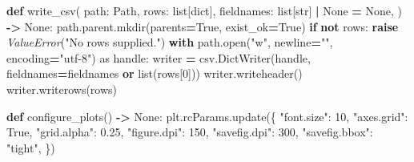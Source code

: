 \documentclass[
  12pt,a4paper,oneside]{report}
\newenvironment{Shaded}{\begin{snugshade}}{\end{snugshade}}
\newcommand{\BuiltInTok}[1]{#1}
\newcommand{\ControlFlowTok}[1]{\textcolor[rgb]{0.13,0.29,0.53}{\textbf{#1}}}
\newcommand{\DecValTok}[1]{\textcolor[rgb]{0.00,0.00,0.81}{#1}}
\newcommand{\FloatTok}[1]{\textcolor[rgb]{0.00,0.00,0.81}{#1}}
\newcommand{\ImportTok}[1]{#1}
\newcommand{\KeywordTok}[1]{\textcolor[rgb]{0.13,0.29,0.53}{\textbf{#1}}}
\newcommand{\NormalTok}[1]{#1}
\newcommand{\OperatorTok}[1]{\textcolor[rgb]{0.81,0.36,0.00}{\textbf{#1}}}
\newcommand{\PreprocessorTok}[1]{\textcolor[rgb]{0.56,0.35,0.01}{\textit{#1}}}
\newcommand{\StringTok}[1]{\textcolor[rgb]{0.31,0.60,0.02}{#1}}
\newcommand{\VariableTok}[1]{\textcolor[rgb]{0.00,0.00,0.00}{#1}}
\begin{document}
\begin{Shaded}
\begin{Highlighting}[]
\KeywordTok{def}\NormalTok{ write\_csv(}
\NormalTok{    path: Path, rows: }\BuiltInTok{list}\NormalTok{[}\BuiltInTok{dict}\NormalTok{], fieldnames: }\BuiltInTok{list}\NormalTok{[}\BuiltInTok{str}\NormalTok{] }\OperatorTok{|} \VariableTok{None} \OperatorTok{=} \VariableTok{None}\NormalTok{,}
\NormalTok{) }\OperatorTok{{-}\textgreater{}} \VariableTok{None}\NormalTok{:}
\NormalTok{    path.parent.mkdir(parents}\OperatorTok{=}\VariableTok{True}\NormalTok{, exist\_ok}\OperatorTok{=}\VariableTok{True}\NormalTok{)}
    \ControlFlowTok{if} \KeywordTok{not}\NormalTok{ rows:}
        \ControlFlowTok{raise} \PreprocessorTok{ValueError}\NormalTok{(}\StringTok{"No rows supplied."}\NormalTok{)}
    \ControlFlowTok{with}\NormalTok{ path.}\BuiltInTok{open}\NormalTok{(}\StringTok{"w"}\NormalTok{, newline}\OperatorTok{=}\StringTok{""}\NormalTok{, encoding}\OperatorTok{=}\StringTok{"utf{-}8"}\NormalTok{) }\ImportTok{as}\NormalTok{ handle:}
\NormalTok{        writer }\OperatorTok{=}\NormalTok{ csv.DictWriter(handle, fieldnames}\OperatorTok{=}\NormalTok{fieldnames }\KeywordTok{or} \BuiltInTok{list}\NormalTok{(rows[}\DecValTok{0}\NormalTok{]))}
\NormalTok{        writer.writeheader()}
\NormalTok{        writer.writerows(rows)}


\KeywordTok{def}\NormalTok{ configure\_plots() }\OperatorTok{{-}\textgreater{}} \VariableTok{None}\NormalTok{:}
\NormalTok{    plt.rcParams.update(\{}
        \StringTok{"font.size"}\NormalTok{: }\DecValTok{10}\NormalTok{,}
        \StringTok{"axes.grid"}\NormalTok{: }\VariableTok{True}\NormalTok{,}
        \StringTok{"grid.alpha"}\NormalTok{: }\FloatTok{0.25}\NormalTok{,}
        \StringTok{"figure.dpi"}\NormalTok{: }\DecValTok{150}\NormalTok{,}
        \StringTok{"savefig.dpi"}\NormalTok{: }\DecValTok{300}\NormalTok{,}
        \StringTok{"savefig.bbox"}\NormalTok{: }\StringTok{"tight"}\NormalTok{,}
\NormalTok{    \})}



\end{Highlighting}
\end{Shaded}
\end{document}
